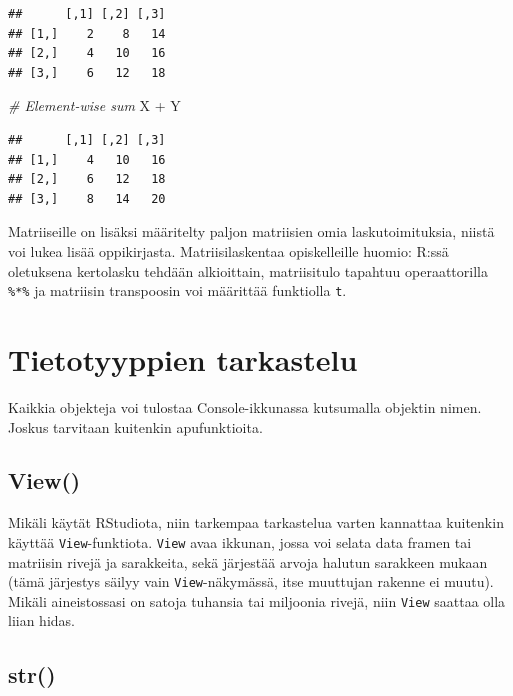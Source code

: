 \documentclass[
]{book}
\newenvironment{Shaded}{\begin{snugshade}}{\end{snugshade}}
\newcommand{\CommentTok}[1]{\textcolor[rgb]{0.56,0.35,0.01}{\textit{#1}}}
\newcommand{\NormalTok}[1]{#1}
\newcommand{\SpecialCharTok}[1]{\textcolor[rgb]{0.00,0.00,0.00}{#1}}
\begin{document}
\begin{verbatim}
##      [,1] [,2] [,3]
## [1,]    2    8   14
## [2,]    4   10   16
## [3,]    6   12   18
\end{verbatim}

\begin{Shaded}
\begin{Highlighting}[]
\CommentTok{\# Element{-}wise sum}
\NormalTok{X }\SpecialCharTok{+}\NormalTok{ Y}
\end{Highlighting}
\end{Shaded}

\begin{verbatim}
##      [,1] [,2] [,3]
## [1,]    4   10   16
## [2,]    6   12   18
## [3,]    8   14   20
\end{verbatim}

Matriiseille on lisäksi määritelty paljon matriisien omia laskutoimituksia, niistä voi lukea lisää oppikirjasta. Matriisilaskentaa opiskelleille huomio: R:ssä oletuksena kertolasku tehdään alkioittain, matriisitulo tapahtuu operaattorilla \texttt{\%*\%} ja matriisin transpoosin voi määrittää funktiolla \texttt{t}.

\hypertarget{data-type-view}{%
\section{Tietotyyppien tarkastelu}\label{data-type-view}}

Kaikkia objekteja voi tulostaa Console-ikkunassa kutsumalla objektin nimen. Joskus tarvitaan kuitenkin apufunktioita.

\hypertarget{view}{%
\subsection{View()}\label{view}}

Mikäli käytät RStudiota, niin tarkempaa tarkastelua varten kannattaa kuitenkin käyttää \texttt{View}-funktiota. \texttt{View} avaa ikkunan, jossa voi selata data framen tai matriisin rivejä ja sarakkeita, sekä järjestää arvoja halutun sarakkeen mukaan (tämä järjestys säilyy vain \texttt{View}-näkymässä, itse muuttujan rakenne ei muutu). Mikäli aineistossasi on satoja tuhansia tai miljoonia rivejä, niin \texttt{View} saattaa olla liian hidas.

\hypertarget{str}{%
\subsection{str()}\label{str}}
\end{document}
